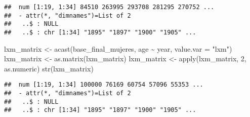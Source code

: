 \documentclass[
]{article}
\newenvironment{Shaded}{\begin{snugshade}}{\end{snugshade}}
\newcommand{\AttributeTok}[1]{\textcolor[rgb]{0.77,0.63,0.00}{#1}}
\newcommand{\DecValTok}[1]{\textcolor[rgb]{0.00,0.00,0.81}{#1}}
\newcommand{\FunctionTok}[1]{\textcolor[rgb]{0.00,0.00,0.00}{#1}}
\newcommand{\NormalTok}[1]{#1}
\newcommand{\OtherTok}[1]{\textcolor[rgb]{0.56,0.35,0.01}{#1}}
\newcommand{\SpecialCharTok}[1]{\textcolor[rgb]{0.00,0.00,0.00}{#1}}
\newcommand{\StringTok}[1]{\textcolor[rgb]{0.31,0.60,0.02}{#1}}
\begin{document}
\begin{verbatim}
##  num [1:19, 1:34] 84510 263995 293708 281295 270752 ...
##  - attr(*, "dimnames")=List of 2
##   ..$ : NULL
##   ..$ : chr [1:34] "1895" "1897" "1900" "1905" ...
\end{verbatim}

\begin{Shaded}
\begin{Highlighting}[]
\NormalTok{lxm\_matrix }\OtherTok{\textless{}{-}} \FunctionTok{acast}\NormalTok{(base\_final\_mujeres, age }\SpecialCharTok{\textasciitilde{}}\NormalTok{ year, }\AttributeTok{value.var =} \StringTok{"lxm"}\NormalTok{)}
\NormalTok{lxm\_matrix }\OtherTok{\textless{}{-}} \FunctionTok{as.matrix}\NormalTok{(lxm\_matrix)}
\NormalTok{lxm\_matrix }\OtherTok{\textless{}{-}} \FunctionTok{apply}\NormalTok{(lxm\_matrix, }\DecValTok{2}\NormalTok{, as.numeric)}
\FunctionTok{str}\NormalTok{(lxm\_matrix)}
\end{Highlighting}
\end{Shaded}

\begin{verbatim}
##  num [1:19, 1:34] 100000 76169 60754 57096 55353 ...
##  - attr(*, "dimnames")=List of 2
##   ..$ : NULL
##   ..$ : chr [1:34] "1895" "1897" "1900" "1905" ...
\end{verbatim}
\end{document}
